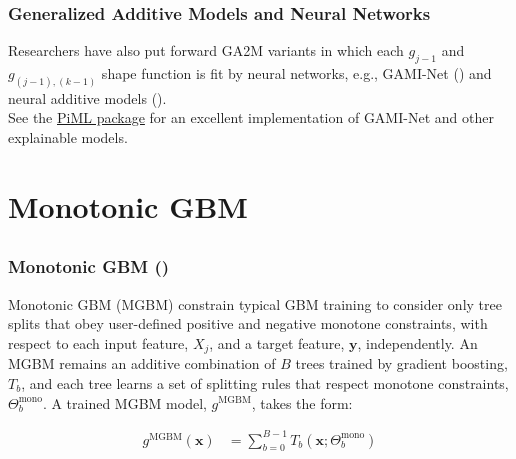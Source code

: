 \documentclass[11pt,aspectratio=169,hyperref={colorlinks}]{beamer}
\begin{document}
	\begin{frame}
	
		\frametitle{Generalized Additive Models and Neural Networks}
		
		\noindent Researchers have also put forward GA2M variants in which each $g_{j-1}$ and $g_{(j-1),(k-1)}$ shape function is fit by neural networks, e.g., GAMI-Net (\citet{yang2021gami}) and neural additive models (\citet{agarwal2021neural}).\\
		\vspace{10pt} 
		\noindent See the \href{https://selfexplainml.github.io/PiML-Toolbox/_build/html/index.html}{PiML package} for an excellent implementation of GAMI-Net and other explainable models. 
		 
	\end{frame}


	\section{Monotonic GBM}

	\subsection*{}
	
	\begin{frame}
	
		\frametitle{Monotonic GBM (\cite{rml_workflow})}

			Monotonic GBM (MGBM) constrain typical GBM training to consider only tree splits that obey user-defined positive and negative monotone constraints, with respect to each input feature, $X_j$, and a target feature, $\mathbf{y}$, independently. An MGBM remains an additive combination of $B$ trees trained by gradient boosting, $T_b$, and each tree learns a set of splitting rules that respect monotone constraints,  $\Theta^\text{mono}_b$. A trained MGBM model, $g^{\text{MGBM}}$, takes the form:
			
			\begin{equation}
			\begin{aligned}\label{eq:gbm}
			g^{\text{MGBM}}(\mathbf{x}) &= \sum_{b=0}^{B-1} T_b\left(\mathbf{x}; \Theta^\text{mono}_b\right)
			\end{aligned}
			\end{equation}
		
	\end{frame}
\end{document}

